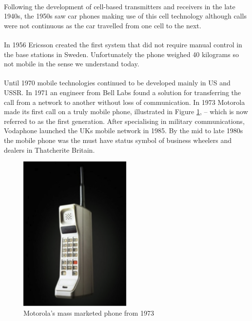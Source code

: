 \documentclass[12pt, a4paper, twoside]{book}
\begin{document}
\paragraph{} Following the development of cell-based transmitters and receivers in the late 1940s, the 1950s saw car phones making use of this cell technology although calls were not continuous as the car travelled from one cell to the next.

\paragraph{} In 1956 Ericsson created the first system that did not require manual control in the base stations in Sweden. Unfortunately the phone weighed 40 kilograms so not mobile in the sense we understand today.

\paragraph{} Until 1970 mobile technologies continued to be developed mainly in US and USSR. In 1971 an engineer from Bell Labs found a solution for transferring the call from a network to another without loss of communication. In 1973 Motorola made its first call on a truly mobile phone, illustrated in Figure \ref{fig:brick-phone}, – which is now referred to as the first generation. After specialising in military communications, Vodaphone launched the UKs mobile network in 1985. By the mid to late 1980s the mobile phone was the must have status symbol of business wheelers and dealers in Thatcherite Britain.

\begin{figure}[htb]
\centering
\includegraphics[width=0.5\textwidth]{images/brick-phone}
\caption{Motorola's mass marketed phone from 1973}
\label{fig:brick-phone}
\end{figure}
\end{document}
